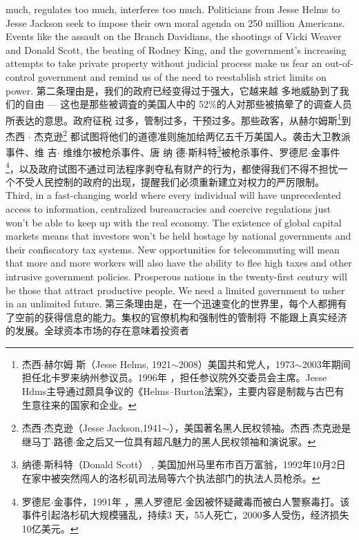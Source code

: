 \begin{paracol}{2}
much, regulates too much, interferes too much. Politicians from
Jesse Helms to Jesse Jackson seek to impose their own moral
agenda on 250 million Americans. Events like the assault on
the Branch Davidians, the shootings of Vicki Weaver and Donald Scott, the beating of Rodney King, and the government's
increasing attempts to take private property without judicial
process make us fear an out-of-control government and remind
us of the need to reestablish strict limits on power.
\switchcolumn
第二条理由是，我们的政府已经变得过于强大，它越来越
多地威胁到了我们的自由 --- 这也是那些被调査的美国人中的
52\%的人对那些被搞晕了的调查人员所表达的意思。政府征税
过多，管制过多，干预过多。那些政客，从赫尔姆斯\footnote{杰西$\cdot$赫尔姆 斯（Jesse Helms, 1921$\sim$2008）美国共和党人，1973$\sim$2003年期间担任北卡罗来纳州参议员。1996年 ，担任参议院外交委员会主席。Jesse Hdms主导通过颇具争议的《Helms--Burton法案》，主要内容是制裁与古巴有生意往来的国家和企业。}到杰西 $\cdot$ 杰克逊\footnote{ 杰西$\cdot$杰克逊（Jesse Jackson,1941$\sim$），美国著名黑人民权领袖。杰西$\cdot$杰克逊是继马丁$\cdot$路德$\cdot$金之后又一位具有超凡魅力的黑人民权领袖和演说家。} 都试图将他们的道德准则施加给两亿五千万美国人。袭击大卫教派事件、维 吉$\cdot$ 维维尔被枪杀事件、唐 纳 德$\cdot$斯科特\footnote{纳德$\cdot$斯科特（Donald Scott） , 美国加州马里布市百万富翁，1992年10月2日在家中被突然闯人的洛杉矶司法局等六个执法部门的执法人员枪杀。}被枪杀事件、罗德尼$\cdot$金事件\footnote{罗德尼$\cdot$金事件，1991年 ，黑人罗德尼$\cdot$金因被怀疑藏毒而被白人警察毒打。该事件引起洛杉矶大规模骚乱，持续3 天，55人死亡，2000多人受伤，经济损失10亿美元。}，以及政府试图不通过司法程序剥夺私有财产的行为，都使得我们不得不担忧一个不受人民控制的政府的出现，提醒我们必须重新建立对权力的严厉限制。
\switchcolumn*
Third, in a fast-changing world where every individual will
have unprecedented access to information, centralized bureaucracies and coercive regulations just won't be able to keep up
with the real economy. The existence of global capital markets
means that investors won't be held hostage by national governments and their confiscatory tax systems. New opportunities
for telecommuting will mean that more and more workers will
also have the ability to flee high taxes and other intrusive government policies. Prosperous nations in the twenty-first century
will be those that attract productive people. We need a limited
government to usher in an unlimited future.
\switchcolumn
第三条理由是，在一个迅速变化的世界里，每个人都拥有
了空前的获得信息的能力。集权的官僚机构和强制性的管制将
不能跟上真实经济的发展。全球资本市场的存在意味着投资者

\end{paracol}
